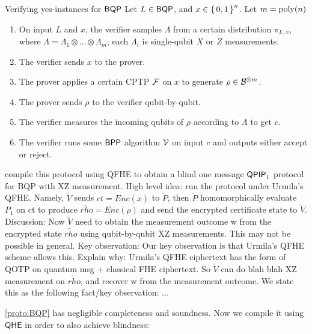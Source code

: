 \begin{protocol}{Verifying yes-instances for $\operatorname{\mathsf{BQP}}$}
	\label{proto:BQP}
	Let $L\in\operatorname{\mathsf{BQP}}$, and $x\in\set{0,1}^n$. Let $m=\operatorname*{\operatorname{poly}}(n)$
	\begin{enumerate}
		\item On input $L$ and $x$, the verifier samples $\Lambda$ from a certain distribution $\pi_{L, x}$, where $\Lambda=\Lambda_1\otimes\ldots\otimes\Lambda_m$; each $\Lambda_i$ is single-qubit $X$ or $Z$ measurements.
		\item The verifier sends $x$ to the prover.
		\item The prover applies a certain CPTP $\mathcal{F}$ on $x$ to generate $\rho\in\mathcal{B}^{\otimes m}$.
		\item The prover sends $\rho$ to the verifier qubit-by-qubit.
		\item The verifier measures the incoming qubits of $\rho$ according to $\Lambda$ to get $c$.
		\item The verifier runs some $\operatorname{\mathsf{BPP}}$ algorithm $\mathcal{V}$ on input $c$ and outputs either accept or reject.
	\end{enumerate}
\end{protocol}


compile this protocol using QFHE to obtain a blind one message $\operatorname{\mathsf{QPIP}}_1$ protocol for BQP with XZ measurement.
High level idea:  run the protocol under Urmila’s QFHE. Namely, $\tilde{V}$ sends $ct = Enc(x)$ to $\tilde{P}$, then $\tilde{P}$ homomorphically evaluate $P_1$ on ct to produce $\tilde{rho} = Enc(\rho)$ and send the encrypted certificate state to $\tilde{V}$.
Discussion: Now $\tilde{V}$ need to obtain the measurement outcome w from the encrypted state $\tilde{rho}$ using qubit-by-qubit XZ measurements. This may not be possible in general. 
Key observation: Our key observation is that Urmila’s QFHE scheme allows this. 
Explain why: Urmila’s QFHE ciphertext has the form of  QOTP on quantum msg + classical FHE ciphertext. So $\tilde{V}$ can do blah blah XZ measurement on $\tilde{rho}$, and recover w from the measurement outcome. We state this as the following fact/key observation: ...


\cref{proto:BQP} has negligible completeness and soundness.
Now we compile it using $\mathsf{QHE}$ in order to also achieve blindness:

